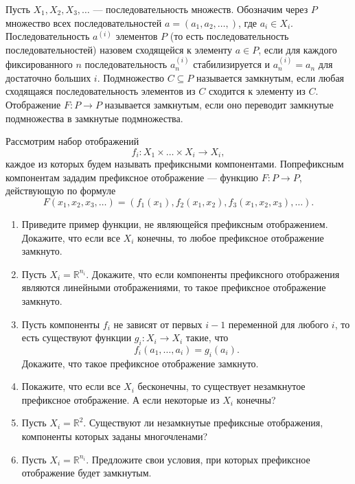 ﻿

Пусть $X_1, X_2, X_3, \ldots$ --- последовательность множеств. Обозначим через $P$ множество всех последовательностей $a=(a_1, a_2, \ldots, )$, где $a_i \in X_i$. Последовательность $a^{(i)}$ элементов $P$ (то есть последовательность последовательностей) назовем сходящейся к элементу $a \in P$, если для каждого фиксированного $n$ последовательность $a_n^{(i)}$ стабилизируется и $a_n^{(i)} = a_n$ для достаточно больших $i$. Подмножество $C \subseteq P$ называется замкнутым, если любая сходящаяся последовательность элементов из $C$ сходится к элементу из $C$. Отображение $F: P \to P$ называется замкнутым, если оно переводит замкнутые подмножества в замкнутые подмножества. 

Рассмотрим набор отображений
$$f_i: X_1 \times \ldots \times X_i \longrightarrow X_i, $$ 
каждое из которых будем называть префиксными компонентами. По\linebreak префиксным компонентам зададим префиксное отображение --- функцию $F: P \to P$, действующую по формуле
$$F(x_1, x_2, x_3, \ldots) = (f_1(x_1), f_2(x_1,x_2), f_3(x_1, x_2, x_3), \ldots).$$ 

\begin{enumerate}
\item Приведите пример функции, не являющейся префиксным отображением. Докажите, что если все $X_i$ конечны, то любое префиксное отображение замкнуто. 
\item Пусть $X_i = \mathbb{R}^{n_i}$. Докажите, что если компоненты префиксного отображения являются линейными отображениями, то такое префиксное отображение замкнуто.
\item Пусть компоненты $f_i$ не зависят от первых $i-1$ переменной для любого $i$, то есть существуют функции $g_i:X_i \to X_i$ такие, что
	$$f_i(a_1, \ldots, a_i) = g_i(a_i).$$
Докажите, что такое префиксное отображение замкнуто.
\item Покажите, что если все $X_i$ бесконечны, то существует незамкнутое префиксное отображение. А если некоторые из $X_i$ конечны?
\item Пусть $X_i = \mathbb{R}^2$. Существуют ли незамкнутые префиксные отображения, компоненты которых заданы многочленами?
\item Пусть $X_i = \mathbb{R}^{n_i}$. Предложите свои условия, при которых префиксное отображение будет замкнутым. 
\end{enumerate}